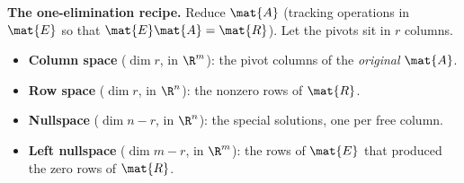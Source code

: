 \begin{formalbox}
\textbf{The one-elimination recipe.} Reduce $\mat{A}$ (tracking operations in $\mat{E}$ so that
$\mat{E}\mat{A}=\mat{R}$). Let the pivots sit in $r$ columns.
\begin{itemize}
  \item \textbf{Column space} ($\dim r$, in $\R^m$): the pivot columns of the \emph{original}
  $\mat{A}$.
  \item \textbf{Row space} ($\dim r$, in $\R^n$): the nonzero rows of $\mat{R}$.
  \item \textbf{Nullspace} ($\dim n-r$, in $\R^n$): the special solutions, one per free column.
  \item \textbf{Left nullspace} ($\dim m-r$, in $\R^m$): the rows of $\mat{E}$ that produced the
  zero rows of $\mat{R}$.
\end{itemize}
\end{formalbox}

